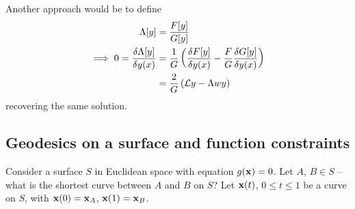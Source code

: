 \documentclass{../../template/note}
\begin{document}
    Another approach would be to define
    \begin{align*}
        \Lambda[y] &= \frac{F[y]}{G[y]} \\
        \implies 0 = \frac{\delta \Lambda[y]}{\delta y(x)} &= \frac 1 G \left(\frac{\delta F[y]}{\delta y(x)} - \frac F G \frac{\delta G[y]}{\delta y(x)}\right) \\
        &= \frac 2 G \left(\mathcal{L} y - \Lambda w y\right)
    \end{align*}
    recovering the same solution.
    
    \subsection{Geodesics on a surface and function constraints}

    Consider a surface $S$ in Euclidean space with equation $g(\V x) = 0$. Let $A$, $B \in S$ -- what is the shortest curve between $A$ and $B$ on $S$? Let $\V x(t)$, $0 \leq t \leq 1$ be a curve on $S$, with $\V x(0) = \V x_A$, $\V x(1) = \V x_B$.
\end{document}
